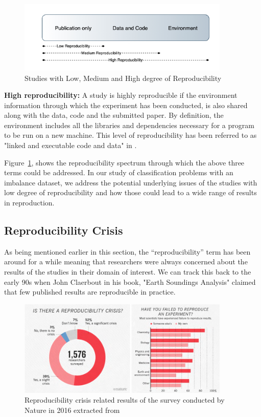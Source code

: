 \begin{figure}[ht]
    \centering
    \includegraphics[width=0.90\textwidth]{figures/02HighLowReproducibility.jpg}
    \caption{Studies with Low, Medium and High degree of Reproducibility}
    \label{fig:LowHighReproducibility}
\end{figure}

\textbf{High reproducibility:} A study is highly reproducible if the environment information through which the experiment 
has been conducted, is also shared along with the data, code and the submitted paper. By definition, the environment 
includes all the libraries and dependencies necessary for a program to be run on a new machine. This level of reproducibility 
has been referred to as "linked and executable code and data" in \cite{peng_reproducible_2011}.

Figure~\ref{fig:LowHighReproducibility}, shows the reproducibility spectrum through which the above three terms 
could be addressed. In our study of classification problems with an imbalance dataset, we address the potential 
underlying issues of the studies with low degree of reproducibility and how those could lead to a wide range of 
results in reproduction.

\subsection{Reproducibility Crisis}
As being mentioned earlier in this section, the “reproducibility” term has been around for a while meaning that 
researchers were always concerned about the results of the studies in their domain of interest. We can track this 
back to the early 90s when John Claerbout in his book, "Earth Soundings Analysis" \cite{claerbout_earth_1992} 
claimed that few published results are reproducible in practice. 

\begin{figure}[ht]
    \centering
    \includegraphics[width=0.90\textwidth]{figures/04NatureMagazine.png}
    \caption{Reproducibility crisis related results of the survey conducted by Nature in 2016 extracted 
    from~\cite{baker_1500_2016}}
    \label{fig:reproducibilityCrisis}
\end{figure}

